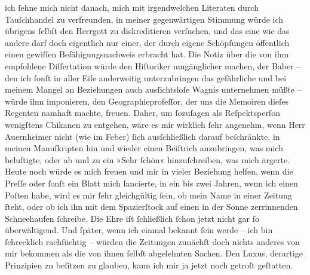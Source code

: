                ich{ }ſehne mich nicht danach, mich mit irgendwelchen Literaten durch Tauſchhandel zu
               verfreunden, in meiner gegenwärtigen Stimmung würde ich übrigens{ }ſelbſt den Herrgott
               zu diskreditieren verſuchen, und das eine wie das andere darf doch eigentlich nur
               einer, der durch eigene Schöpfungen öffentlich einen gewiſſen Befähigungsnachweis
               erbracht hat. Die Notiz über die von ihm empfohlene Diſſertation würde den Hiſtoriker umgänglicher machen, der
                  Baber – den ich{ }ſonſt in aller Eile
               anderweitig unterzubringen das gefährliche und bei meinem Mangel an Beziehungen auch
               ausſichtsloſe Wagnis unternehmen müßte – würde ihm imponieren, den Geographieprofeſſor, der uns die Memoiren dieſes Regenten namhaft machte,
               freuen. Daher, um{ }ſozuſagen als Reſpektsperſon wenigſtens Chikanen zu entgehen, wäre
               es mir wirklich{ }ſehr angenehm, wenn Herr Auernheimer nicht (wie im Feber){ }ſich ausſchließlich darauf
               beſchränkte, in meinen Manuſkripten hin und wieder einen Beiſtrich anzubringen, was
               mich beluſtigte, oder ab und zu ein »Sehr{ }ſchön« hinzuſchreiben, was mich ärgerte.
               Heute noch würde es mich freuen und mir in vieler Beziehung helfen, wenn die Preſſe oder{ }ſonſt ein Blatt mich lancierte, in ein
               bis zwei Jahren, wenn ich einen Poſten habe, wird es mir{ }ſehr gleichgültig{ }ſein, ob
               mein Name in einer Zeitung{ }ſteht, oder ob ich ihn mit dem Spazierſtock auf einen in
               der Sonne zerrinnenden Schneehaufen{ }ſchreibe. {\pb}Die Ehre iſt{ }ſchließlich{ }ſchon jetzt nicht
               gar{ }ſo überwältigend. Und{ }ſpäter, wenn ich einmal bekannt{ }ſein werde – ich bin{ }ſchrecklich rachſüchtig – würden die Zeitungen zunächſt doch nichts anderes von mir
               bekommen als die von ihnen{ }ſelbſt abgelehnten Sachen. Den Luxus, derartige Prinzipien
                  \introOben{}zu\introOben{} beſitzen zu glauben, kann ich mir ja jetzt noch
               getroſt geſtatten.\pend
           
